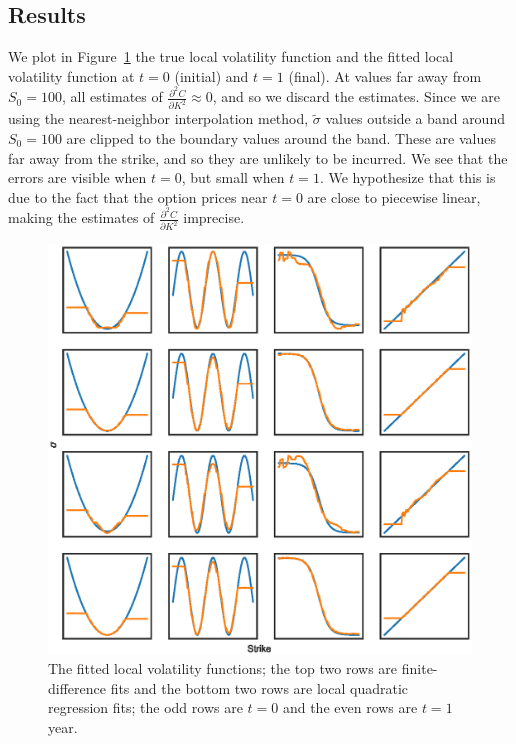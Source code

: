 \documentclass[11pt]{article}
\numberwithin{equation}{section}
\newcommand{\diff}[2]{\frac{\partial #1}{\partial #2}}
\begin{document}
\subsection{Results}
We plot in Figure~\ref{fig:fits} the true local volatility function and the fitted local volatility function at $t=0$ (initial) and $t=1$ (final). At values far away from $S_0 = 100$, all estimates of $\diff{^2C}{K^2} \approx 0$, and so we discard the estimates. Since we are using the nearest-neighbor interpolation method, $\tilde\sigma$ values outside a band around $S_0 = 100$ are clipped to the boundary values around the band. These are values far away from the strike, and so they are unlikely to be incurred. We see that the errors are visible when $t = 0$, but small when $t=1$. We hypothesize that this is due to the fact that the option prices near $t=0$ are close to piecewise linear, making the estimates of $\diff{^2C}{K^2}$ imprecise.
 
\begin{figure}[h!]
  \centering
  \includegraphics[width=\textwidth]{figs/fits.eps}
  \caption{The fitted local volatility functions; the top two rows are finite-difference fits and the bottom two rows are local quadratic regression fits; the odd rows are $t=0$ and the even rows are $t=1$ year.}
  \label{fig:fits}
\end{figure}
\end{document}

